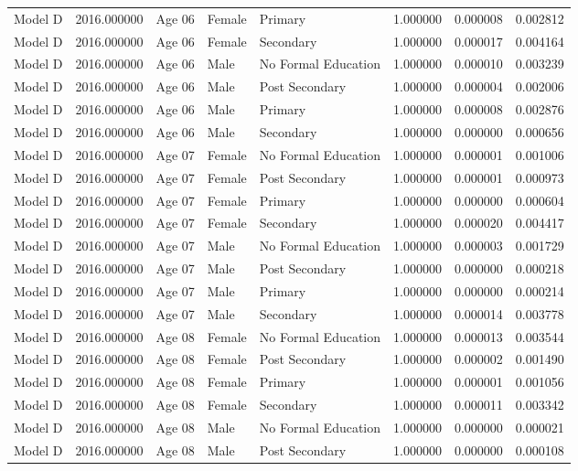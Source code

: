 \begin{table}[ht]
\begin{tabular}{lrlllrrr}
Model D & 2016.000000 & Age 06 & Female & Primary & 1.000000 & 0.000008 & 0.002812 \\
Model D & 2016.000000 & Age 06 & Female & Secondary & 1.000000 & 0.000017 & 0.004164 \\
Model D & 2016.000000 & Age 06 & Male & No Formal Education & 1.000000 & 0.000010 & 0.003239 \\
Model D & 2016.000000 & Age 06 & Male & Post Secondary & 1.000000 & 0.000004 & 0.002006 \\
Model D & 2016.000000 & Age 06 & Male & Primary & 1.000000 & 0.000008 & 0.002876 \\
Model D & 2016.000000 & Age 06 & Male & Secondary & 1.000000 & 0.000000 & 0.000656 \\
Model D & 2016.000000 & Age 07 & Female & No Formal Education & 1.000000 & 0.000001 & 0.001006 \\
Model D & 2016.000000 & Age 07 & Female & Post Secondary & 1.000000 & 0.000001 & 0.000973 \\
Model D & 2016.000000 & Age 07 & Female & Primary & 1.000000 & 0.000000 & 0.000604 \\
Model D & 2016.000000 & Age 07 & Female & Secondary & 1.000000 & 0.000020 & 0.004417 \\
Model D & 2016.000000 & Age 07 & Male & No Formal Education & 1.000000 & 0.000003 & 0.001729 \\
Model D & 2016.000000 & Age 07 & Male & Post Secondary & 1.000000 & 0.000000 & 0.000218 \\
Model D & 2016.000000 & Age 07 & Male & Primary & 1.000000 & 0.000000 & 0.000214 \\
Model D & 2016.000000 & Age 07 & Male & Secondary & 1.000000 & 0.000014 & 0.003778 \\
Model D & 2016.000000 & Age 08 & Female & No Formal Education & 1.000000 & 0.000013 & 0.003544 \\
Model D & 2016.000000 & Age 08 & Female & Post Secondary & 1.000000 & 0.000002 & 0.001490 \\
Model D & 2016.000000 & Age 08 & Female & Primary & 1.000000 & 0.000001 & 0.001056 \\
Model D & 2016.000000 & Age 08 & Female & Secondary & 1.000000 & 0.000011 & 0.003342 \\
Model D & 2016.000000 & Age 08 & Male & No Formal Education & 1.000000 & 0.000000 & 0.000021 \\
Model D & 2016.000000 & Age 08 & Male & Post Secondary & 1.000000 & 0.000000 & 0.000108 \\

\end{tabular}
\end{table}

